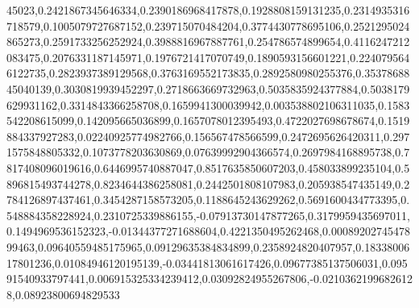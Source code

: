 45023,0.2421867345646334,0.2390186968417878,0.1928808159131235,0.2314935316718579,0.1005079727687152,0.239715070484204,0.3774430778695106,0.2521295024865273,0.2591733256252924,0.3988816967887761,0.254786574899654,0.4116247212083475,0.2076331187145971,0.1976721417070749,0.1890593156601221,0.2240795646122735,0.2823937389129568,0.3763169552173835,0.2892580980255376,0.3537868845040139,0.3030819939452297,0.2718663669732963,0.5035835924377884,0.5038179629931162,0.3314843366258708,0.1659941300039942,0.003538802106311035,0.1583542208615099,0.142095665036899,0.1657078012395493,0.4722027698678674,0.1519884337927283,0.02240925774982766,0.156567478566599,0.2472695626420311,0.2971575848805332,0.1073778203630869,0.07639992904366574,0.2697984168895738,0.7817408096019616,0.6446995740887047,0.8517635850607203,0.458033899235104,0.5896815493744278,0.8234644386258081,0.2442501808107983,0.205938547435149,0.2784126897437461,0.3454287158573205,0.1188645243629262,0.5691600434773395,0.548884358228924,0.2310725339886155,-0.07913730147877265,0.3179959435697011,0.1494969536152323,-0.01344377271688604,0.4221350495262468,0.0008920274547899463,0.09640559485175965,0.09129635384834899,0.2358924820407957,0.1833800617801236,0.01084946120195139,-0.03441813061617426,0.09677385137506031,0.09591540933797441,0.006915325334239412,0.03092824955267806,-0.02103621996826128,0.08923800694829533
